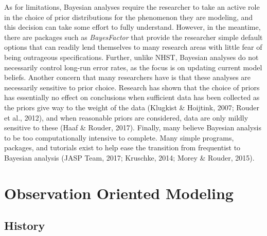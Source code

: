 \documentclass[,man, mask]{apa6}
\begin{document}
As for limitations, Bayesian analyses require the researcher to take an active role in the choice of prior distributions for the phenomenon they are modeling, and this decision can take some effort to fully understand. However, in the meantime, there are packages such as \emph{BayesFactor} that provide the researcher simple default options that can readily lend themselves to many research areas with little fear of being outrageous specifications. Further, unlike NHST, Bayesian analyses do not necessarily control long-run error rates, as the focus is on updating current model beliefs. Another concern that many researchers have is that these analyses are necessarily sensitive to prior choice. Research has shown that the choice of priors has essentially no effect on conclusions when sufficient data has been collected as the priors give way to the weight of the data (Klugkist \& Hoijtink, 2007; Rouder et al., 2012), and when reasonable priors are considered, data are only mildly sensitive to these (Haaf \& Rouder, 2017). Finally, many believe Bayesian analysis to be too computationally intensive to complete. Many simple programs, packages, and tutorials exist to help ease the transition from frequentist to Bayesian analysis (JASP Team, 2017; Kruschke, 2014; Morey \& Rouder, 2015).
\newline
\newline

\hypertarget{observation-oriented-modeling}{%
\section{Observation Oriented Modeling}\label{observation-oriented-modeling}}

\hypertarget{history-2}{%
\subsection{History}\label{history-2}}
\end{document}
